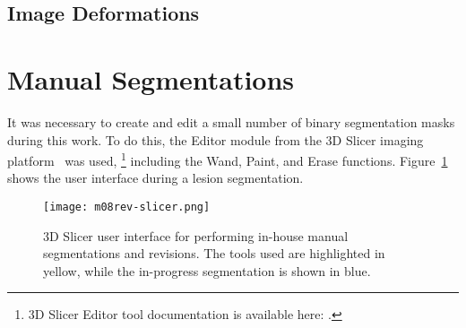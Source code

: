 \subsection{Image Deformations}
%
\section{Manual Segmentations}
It was necessary to create and edit a small number of binary segmentation masks during this work.
To do this, the Editor module from the 3D Slicer imaging platform~\cite{Fedorov2012} was used,%
\footnote{3D Slicer Editor tool documentation is available here:
  .}
including the Wand, Paint, and Erase functions.
Figure~\ref{fig:m08-rev-slicer} shows the user interface during a lesion segmentation.
\begin{figure}[h]
  \centering
  \texttt{[image: m08rev-slicer.png]}
  \caption{3D Slicer user interface for performing in-house manual segmentations and revisions.
    The tools used are highlighted in yellow, while the in-progress segmentation is shown in blue.}%
  \label{fig:m08-rev-slicer}
\end{figure}
